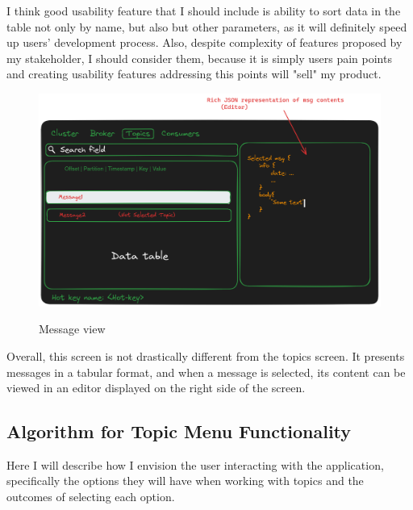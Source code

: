 \documentclass[10pt , a4paper]{report}
\begin{document}
I think good usability feature that I should include is ability to sort data in the table not only by name, but also but other parameters, as it will definitely speed up users' development process. Also, despite complexity of features proposed by my stakeholder, I should consider them, because it is simply users pain points and creating usability features addressing this points will "sell" my product.

\begin{figure}[htbp]
    \centering
    \includegraphics[width=.8\linewidth]{imgs/MessageView.png}
    \label{fig:message_view}
    \caption{Message view}
\end{figure}

Overall, this screen is not drastically different from the topics screen. It presents messages in a tabular format, and when a message is selected, its content can be viewed in an editor displayed on the right side of the screen.

\subsection{Algorithm for Topic Menu Functionality}

Here I will describe how I envision the user interacting with the application, specifically the options they will have when working with topics and the outcomes of selecting each option.
\end{document}
